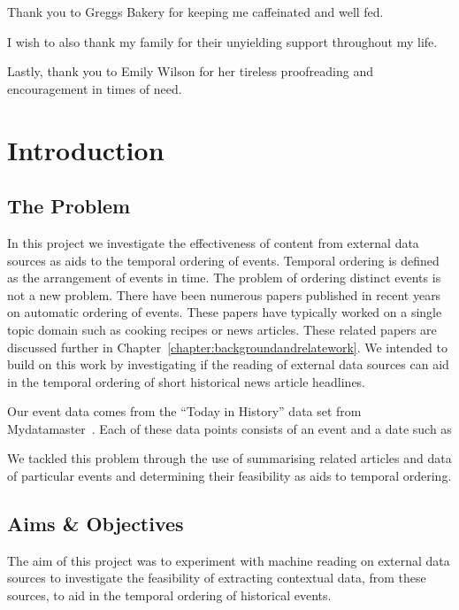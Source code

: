 \documentclass[bsc,frontabs,twoside,singlespacing,parskip,deptreport]{infthesis}     %
\begin{document}
Thank you to Greggs Bakery for keeping me caffeinated and well fed.

I wish to also thank my family for their unyielding support throughout my life. 

Lastly, thank you to Emily Wilson for her tireless proofreading and encouragement in times of need.

\tableofcontents



\chapter{Introduction}
\section{The Problem}
In this project we investigate the effectiveness of content from external data sources as aids to the temporal
ordering of events. Temporal ordering is defined as the arrangement of events in time.
The problem of ordering distinct events is not a new problem. There have been numerous papers published
in recent years on automatic ordering of events. These papers have typically worked on a single
topic domain such as cooking recipes or news articles. These related papers are discussed further in Chapter~\ref{chapter:backgroundandrelatework}.
We intended to build on this work by
investigating if the reading of external data sources can aid in the temporal ordering of short
historical news article headlines.

Our event data comes from the ``Today in History'' data set from Mydatamaster~\cite{mydatamaster}. Each of these data points consists
of an event and a date such as
\begin{equation}
  [ \text{``Alaska becomes 49th State''}, \text{``1959-01-01''} ]\nonumber
\end{equation}


We tackled this problem through the use of summarising related articles and data of particular
events and determining their feasibility as aids to temporal ordering. 

\section{Aims \& Objectives}
The aim of this project was to experiment with machine reading on external data sources to
investigate the feasibility of extracting contextual data, from these sources, to aid in the
temporal ordering of historical events.
\end{document}
